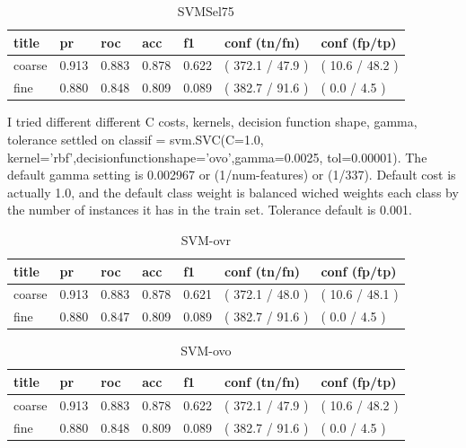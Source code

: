 \documentclass[ms]{nuthesis}
\begin{document}
\FloatBarrier
\begin{table}[H]
\centering
\begin{tabular}{|l||l||l||l||l||l||l|}\toprule
title & pr & roc & acc & f1 & conf (tn/fn) & conf (fp/tp) \\ \midrule
coarse & 0.913 & 0.883 & 0.878 & 0.622 & ( 372.1 / 47.9 ) & ( 10.6 / 48.2 ) \\
fine & 0.880 & 0.848 & 0.809 & 0.089 & ( 382.7 / 91.6 ) & ( 0.0 / 4.5 ) \\ \bottomrule
\end{tabular}
\caption{SVMSel75}
\label{tab:SVMSel75}
\end{table}
\FloatBarrier



\par I tried different different C costs, kernels, decision function shape, gamma, tolerance
settled on classif = svm.SVC(C=1.0, kernel='rbf',decisionfunctionshape='ovo',gamma=0.0025,
 tol=0.00001). The default gamma setting is 0.002967 or (1/num-features) or (1/337). Default
 cost is actually 1.0, and the default class weight is balanced wiched weights each class by
 the number of instances it has in the train set. Tolerance default is 0.001.


\FloatBarrier
\begin{table}[H]
\centering
\begin{tabular}{|l||l||l||l||l||l||l|}\toprule
title & pr & roc & acc & f1 & conf (tn/fn) & conf (fp/tp) \\ \midrule
coarse & 0.913 & 0.883 & 0.878 & 0.621 & ( 372.1 / 48.0 ) & ( 10.6 / 48.1 ) \\
fine & 0.880 & 0.847 & 0.809 & 0.089 & ( 382.7 / 91.6 ) & ( 0.0 / 4.5 ) \\ \bottomrule
\end{tabular}
\caption{SVM-ovr}
\label{tab:SVM-ovr}
\end{table}
\FloatBarrier


\FloatBarrier
\begin{table}[H]
\centering
\begin{tabular}{|l||l||l||l||l||l||l|}\toprule
title & pr & roc & acc & f1 & conf (tn/fn) & conf (fp/tp) \\ \midrule
coarse & 0.913 & 0.883 & 0.878 & 0.622 & ( 372.1 / 47.9 ) & ( 10.6 / 48.2 ) \\
fine & 0.880 & 0.848 & 0.809 & 0.089 & ( 382.7 / 91.6 ) & ( 0.0 / 4.5 ) \\ \bottomrule
\end{tabular}
\caption{SVM-ovo}
\label{tab:SVM-ovo}
\end{table}
\FloatBarrier
\end{document}
